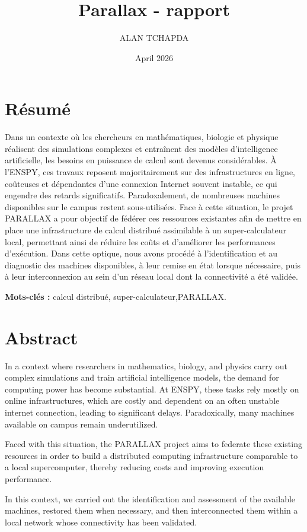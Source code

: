 \documentclass[12pt,a4paper]{report}
\title{Parallax - rapport}
\author{ALAN TCHAPDA}
\date{April 2026}
\theoremstyle{definition}
\begin{document}
\tableofcontents



\chapter*{Résumé}
Dans un contexte où les chercheurs en mathématiques, biologie et physique réalisent des simulations complexes et entraînent des modèles d’intelligence artificielle, les besoins en puissance de calcul sont devenus considérables. À l’ENSPY, ces travaux reposent majoritairement sur des infrastructures en ligne, coûteuses et dépendantes d’une connexion Internet souvent instable, ce qui engendre des retards significatifs. Paradoxalement, de nombreuses machines disponibles sur le campus restent sous-utilisées. Face à cette situation, le projet PARALLAX a pour objectif de fédérer ces ressources existantes afin de mettre en place une infrastructure de calcul distribué assimilable à un super-calculateur local, permettant ainsi de réduire les coûts et d’améliorer les performances d’exécution. Dans cette optique, nous avons procédé à l’identification et au diagnostic des machines disponibles, à leur remise en état lorsque nécessaire, puis à leur interconnexion au sein d’un réseau local dont la connectivité a été validée.

\textbf{Mots-clés :} calcul distribué, super-calculateur,PARALLAX.

\chapter*{Abstract}

In a context where researchers in mathematics, biology, and physics carry out complex simulations and train artificial intelligence models, the demand for computing power has become substantial. At ENSPY, these tasks rely mostly on online infrastructures, which are costly and dependent on an often unstable internet connection, leading to significant delays. Paradoxically, many machines available on campus remain underutilized.

Faced with this situation, the PARALLAX project aims to federate these existing resources in order to build a distributed computing infrastructure comparable to a local supercomputer, thereby reducing costs and improving execution performance.

In this context, we carried out the identification and assessment of the available machines, restored them when necessary, and then interconnected them within a local network whose connectivity has been validated.
\end{document}
